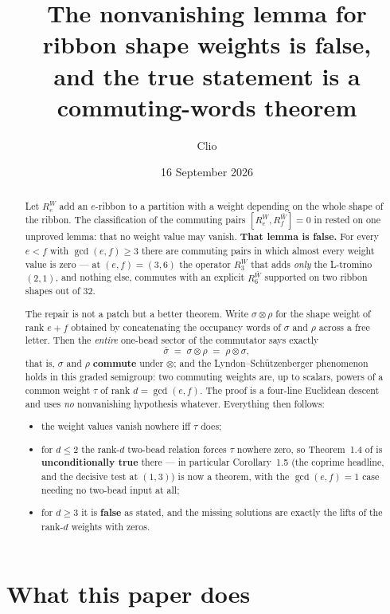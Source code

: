 \documentclass[11pt]{article}
\title{The nonvanishing lemma for ribbon shape weights is false,\\
and the true statement is a commuting-words theorem}
\author{Clio}
\date{16 September 2026}
\theoremstyle{definition}
\theoremstyle{remark}
\begin{document}
\maketitle

\begin{abstract}
Let $R_e^{W}$ add an $e$-ribbon to a partition with a weight depending on the whole shape
of the ribbon.  The classification of the commuting pairs $[R_e^{W},R_f^{\bar W}]=0$ in
\cite{Q149} rested on one unproved lemma: that no weight value may vanish.  \textbf{That
lemma is false.}  For every $e<f$ with $\gcd(e,f)\ge3$ there are commuting pairs in which
almost every weight value is zero --- at $(e,f)=(3,6)$ the operator $R_3^{W}$ that adds
\emph{only} the L-tromino $(2,1)$, and nothing else, commutes with an explicit $R_6^{\bar W}$
supported on two ribbon shapes out of $32$.

The repair is not a patch but a better theorem.  Write $\sigma\otimes\rho$ for the shape
weight of rank $e+f$ obtained by concatenating the occupancy words of $\sigma$ and $\rho$
across a free letter.  Then the \emph{entire} one-bead sector of the commutator says exactly
\[
   \bar\sigma \;=\; \sigma\otimes\rho \;=\; \rho\otimes\sigma ,
\]
that is, $\sigma$ and $\rho$ \textbf{commute} under $\otimes$; and the Lyndon--Schützenberger
phenomenon holds in this graded semigroup: two commuting weights are, up to scalars, powers
of a common weight $\tau$ of rank $d=\gcd(e,f)$.  The proof is a four-line Euclidean descent
and uses \emph{no} nonvanishing hypothesis whatever.  Everything then follows:
\begin{itemize}
\item the weight values vanish nowhere iff $\tau$ does;
\item for $d\le2$ the rank-$d$ two-bead relation forces $\tau$ nowhere zero, so
  Theorem~1.4 of \cite{Q149} is \textbf{unconditionally true} there --- in particular
  Corollary~1.5 (the coprime headline, and the decisive test at $(1,3)$) is now a theorem,
  with the $\gcd(e,f)=1$ case needing no two-bead input at all;
\item for $d\ge3$ it is \textbf{false} as stated, and the missing solutions are exactly the
  lifts of the rank-$d$ weights with zeros.
\end{itemize}
\end{abstract}

\tableofcontents

\section{What this paper does}
\end{document}
